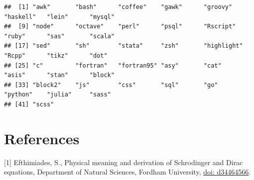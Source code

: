 \documentclass[portrait]{article}
\newenvironment{Shaded}{\begin{snugshade}}{\end{snugshade}}
\newcommand{\KeywordTok}[1]{\textcolor[rgb]{0.13,0.29,0.53}{\textbf{#1}}}
\newcommand{\OperatorTok}[1]{\textcolor[rgb]{0.81,0.36,0.00}{\textbf{#1}}}
\newcommand{\NormalTok}[1]{#1}
\begin{document}
\begin{Shaded}
\end{Shaded}

\begin{verbatim}
##  [1] "awk"       "bash"      "coffee"    "gawk"      "groovy"    "haskell"   "lein"      "mysql"    
##  [9] "node"      "octave"    "perl"      "psql"      "Rscript"   "ruby"      "sas"       "scala"    
## [17] "sed"       "sh"        "stata"     "zsh"       "highlight" "Rcpp"      "tikz"      "dot"      
## [25] "c"         "fortran"   "fortran95" "asy"       "cat"       "asis"      "stan"      "block"    
## [33] "block2"    "js"        "css"       "sql"       "go"        "python"    "julia"     "sass"     
## [41] "scss"
\end{verbatim}

\section{References}\label{references}

{[}1{]} Efthimiades, S., Physical meaning and derivation of Schrodinger
and Dirac equations, Department of Natural Sciences, Fordham University,
\href{https://arxiv.org/vc/quant-ph/papers/0607/0607001v1.pdf}{doi:
d34464566}.
\end{document}

